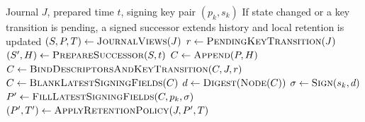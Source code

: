\begin{algorithm}[htbp]
\caption{Commit Journal Step}
\label{alg:commit-step}
\begin{algorithmic}[1]
\Require Journal $J$, prepared time $t$, signing key pair $(p_k,s_k)$
\Ensure If state changed or a key transition is pending, a signed successor extends history and local retention is updated
  \State $(S,P,T) \gets \Call{JournalViews}{J}$ 
  \State $r \gets \Call{PendingKeyTransition}{J}$
  \State {}
    \State \Return {}
  \EndIf
  \State $(S',H) \gets \Call{PrepareSuccessor}{S,t}$
  \State $C \gets \Call{Append}{P,H}$
  \State $C \gets \Call{BindDescriptorsAndKeyTransition}{C,J,r}$ 
  \State $C \gets \Call{BlankLatestSigningFields}{C}$
  \State $d \gets \Call{Digest}{\textproc{Node}(C)}$ 
  \State $\sigma \gets \Call{Sign}{s_k,d}$
  \State $P' \gets \Call{FillLatestSigningFields}{C,p_k,\sigma}$
  \State $(P',T') \gets \Call{ApplyRetentionPolicy}{J,P',T}$
  \Statex {}
  \State {}
  \State \Return {}
\EndFunction
\end{algorithmic}
\end{algorithm}
